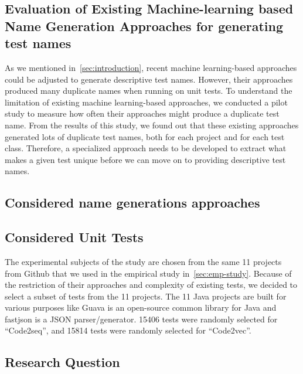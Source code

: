 \newpage
\begin{appendices}
\section{Evaluation of Existing Machine-learning based Name Generation Approaches for generating test names}

As we mentioned in~\cref{sec:introduction}, recent machine learning-based approaches could be adjusted to generate descriptive test names.
%
However, their approaches produced many duplicate names when running on unit tests.
%
To understand the limitation of existing machine learning-based approaches, we conducted a pilot study to measure how often their approaches might produce a duplicate test name.
%
From the results of this study, we found out that these existing approaches generated lots of duplicate test names, both for each project and for each test class.
%
Therefore, a specialized approach needs to be developed to extract what makes a given test unique before we can move on to providing descriptive test names.


\subsection{Considered name generations approaches}


\subsection{Considered Unit Tests}

The experimental subjects of the study are chosen from the same \num{11} projects from Github that we used in the empirical study in~\cref{sec:emp-study}.
%
Because of the restriction of their approaches and complexity of existing tests, we decided to select a subset of tests from the \num{11} projects.
%
The \num{11} Java projects are built for various purposes like Guava is an open-source common library for Java and fastjson is a JSON parser\slash generator.
%
\num{15406} tests were randomly selected for \enquote{Code2seq}, and \num{15814} tests were randomly selected for \enquote{Code2vec}.


\subsection{Research Question}


\end{appendices}
